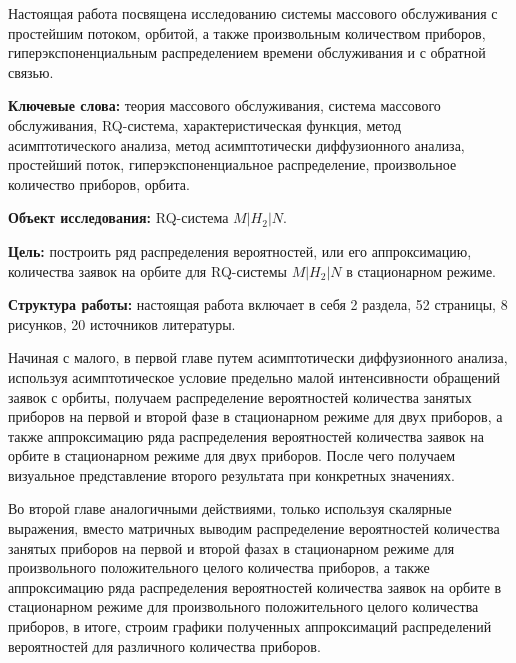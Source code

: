 Настоящая работа посвящена исследованию системы массового обслуживания с простейшим потоком, орбитой, а также произвольным количеством приборов, гиперэкспоненциальным распределением времени обслуживания и с обратной связью.

\textbf{Ключевые слова:} теория массового обслуживания, система массового обслуживания, RQ-система, характеристическая функция, метод асимптотического анализа, метод асимптотически диффузионного анализа, простейший поток, гиперэкспоненциальное распределение, произвольное количество приборов, орбита.

\textbf{Объект исследования:} RQ-система $M|H_2|N$.

\textbf{Цель:} построить ряд распределения вероятностей, или его аппроксимацию, количества заявок на орбите для RQ-системы $M|H_2|N$ в стационарном режиме.

\textbf{Структура работы:} настоящая работа включает в себя 2 раздела, 52 страницы, 8 рисунков, 20 источников литературы.

Начиная с малого, в первой главе путем асимптотически диффузионного анализа, используя асимптотическое условие предельно малой интенсивности обращений заявок с орбиты, получаем распределение вероятностей количества занятых приборов на первой и второй фазе в стационарном режиме для двух приборов, а также аппроксимацию ряда распределения вероятностей количества заявок на орбите в стационарном режиме для двух приборов. После чего получаем визуальное представление второго результата при конкретных значениях. 

Во второй главе аналогичными действиями, только используя скалярные выражения, вместо матричных выводим распределение вероятностей количества занятых приборов на первой и второй фазах в стационарном режиме для произвольного положительного целого количества приборов, а также аппроксимацию ряда распределения вероятностей количества заявок на орбите в стационарном режиме для произвольного положительного целого количества приборов, в итоге, строим графики полученных аппроксимаций распределений вероятностей для различного количества приборов.
